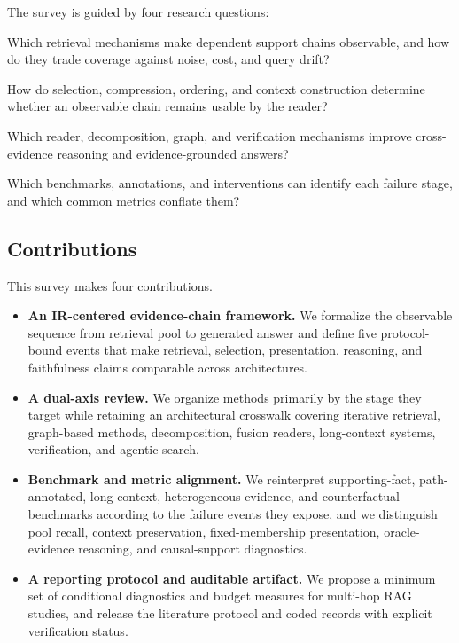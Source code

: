 \documentclass[manuscript,review]{acmart}
\theoremstyle{definition}
\theoremstyle{plain}
\theoremstyle{remark}
\begin{document}
The survey is guided by four research questions:
\begin{description}[leftmargin=1.5em,style=nextline]
\item[RQ1: Evidence acquisition.] Which retrieval mechanisms make dependent
support chains observable, and how do they trade coverage against noise,
cost, and query drift?
\item[RQ2: Budget and presentation.] How do selection, compression, ordering,
and context construction determine whether an observable chain remains
usable by the reader?
\item[RQ3: Composition and support.] Which reader, decomposition, graph, and
verification mechanisms improve cross-evidence reasoning and evidence-grounded
answers?
\item[RQ4: Evaluation.] Which benchmarks, annotations, and interventions can
identify each failure stage, and which common metrics conflate them?
\end{description}

\subsection{Contributions}
\label{subsec:contributions}

This survey makes four contributions.
\begin{itemize}[leftmargin=1.3em]
\item \textbf{An IR-centered evidence-chain framework.} We formalize the
observable sequence from retrieval pool to generated answer and define five
protocol-bound events that make retrieval, selection, presentation,
reasoning, and faithfulness claims comparable across architectures.
\item \textbf{A dual-axis review.} We organize methods primarily by the stage
they target while retaining an architectural crosswalk covering iterative
retrieval, graph-based methods, decomposition, fusion readers, long-context
systems, verification, and agentic search.
\item \textbf{Benchmark and metric alignment.} We reinterpret supporting-fact,
path-annotated, long-context, heterogeneous-evidence, and counterfactual
benchmarks according to the failure events they expose, and we distinguish
pool recall, context preservation, fixed-membership presentation, oracle-
evidence reasoning, and causal-support diagnostics.
\item \textbf{A reporting protocol and auditable artifact.} We propose a
minimum set of conditional diagnostics and budget measures for multi-hop RAG
studies, and release the literature protocol and coded records with explicit
verification status.
\end{itemize}
\end{document}
